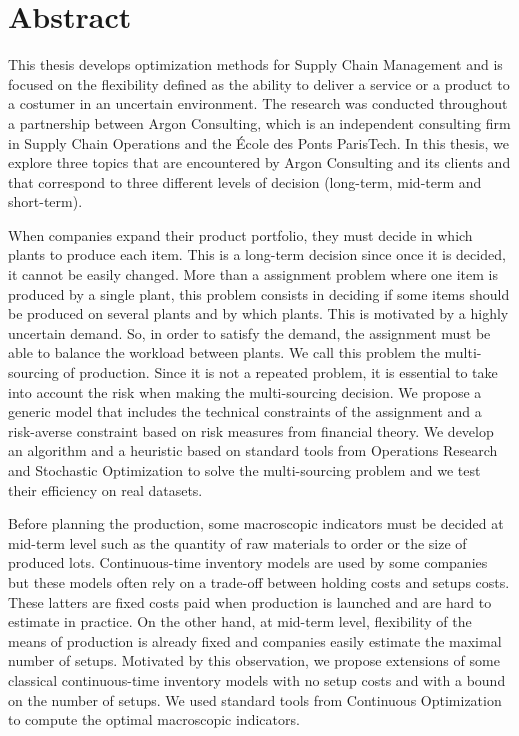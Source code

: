 \chapter*{Abstract} %
\label{cha:abstract}



This thesis develops optimization methods for Supply Chain Management and is focused on the flexibility defined as the ability to deliver a service or a product to a costumer in an uncertain environment.
The research was conducted throughout a partnership between Argon Consulting, which is an independent consulting firm in Supply Chain Operations and the \'Ecole des Ponts ParisTech.
In this thesis, we explore three topics that are encountered by Argon Consulting and its clients and that correspond to three different levels of decision (long-term, mid-term and short-term).


When companies expand their product portfolio, they must decide in which plants to produce each item.
This is a long-term decision since once it is decided, it cannot be easily changed.
More than a assignment problem where one item is produced by a single plant, this problem  consists in deciding if some items should be produced on several plants and by which plants.
This is motivated by a highly uncertain demand.
So, in order to satisfy the demand, the assignment must be able to balance the workload between plants.
We call this problem the multi-sourcing of production.
Since it is not a repeated problem, it is essential to take into account the risk when making the multi-sourcing decision.
We propose a generic model that includes the technical constraints of the assignment and a risk-averse constraint based on risk measures from financial theory.
We develop an algorithm and a heuristic based on standard tools from Operations Research and Stochastic Optimization to solve the multi-sourcing problem and we test their efficiency on real datasets.


Before planning the production, some macroscopic indicators must be decided at mid-term level such as the quantity of raw materials to order or the size of produced lots.
Continuous-time inventory models are used by some companies but these models often rely on a trade-off between holding costs and setups costs.
These latters are fixed costs paid when production is launched and are hard to estimate in practice.
On the other hand, at mid-term level, flexibility of the means of production is already fixed and companies easily estimate the maximal number of setups.
Motivated by this observation, we propose extensions of some classical continuous-time inventory models with no setup costs and with a bound on the number of setups.
We used standard tools from Continuous Optimization to compute the optimal macroscopic indicators.



